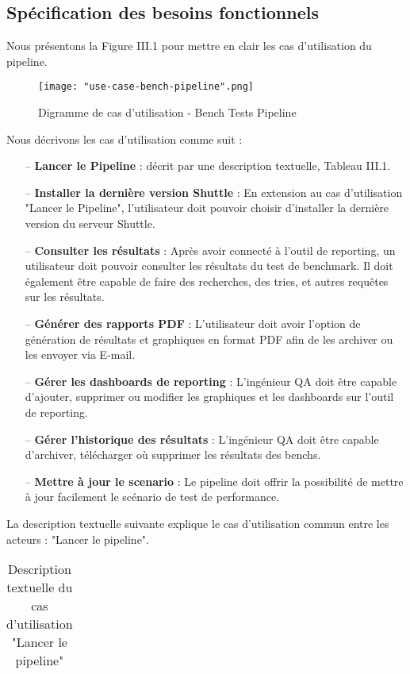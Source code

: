 \begin{spacing}{1.2}
\subsection{Spécification des besoins fonctionnels}
Nous présentons la Figure III.1 pour mettre en clair les cas d'utilisation du pipeline. 
\begin{figure}[!ht]\centering
\texttt{[image: "use-case-bench-pipeline".png]}
\caption{Digramme de cas d'utilisation - Bench Tests Pipeline}
\label{fig:fig1}
\end{figure}
\FloatBarrier
Nous décrivons les cas d'utilisation comme suit : 
\begin{itemize}
    \setlength\itemsep{0em}
    \item[--] \textbf{Lancer le Pipeline} : décrit par une description textuelle, Tableau III.1. 
    \item[--] \textbf{Installer la dernière version Shuttle} : En extension au cas d'utilisation "Lancer le Pipeline", l'utilisateur doit pouvoir choisir d'installer la dernière version du serveur Shuttle. 
    \item[--] \textbf{Consulter les résultats} : Après avoir connecté à l'outil de reporting, un utilisateur doit pouvoir consulter les résultats du test de benchmark. Il doit également être capable de faire des recherches, des tries, et autres requêtes sur les résultats.
    \item[--] \textbf{Générer des rapports PDF} : L'utilisateur doit avoir l'option de génération de résultats et graphiques en format PDF afin de les archiver ou les envoyer via E-mail.
    \item[--] \textbf{Gérer les dashboards de reporting} : L'ingénieur QA doit être capable d'ajouter, supprimer ou modifier les graphiques et les dashboards sur l'outil de reporting.
    \item[--] \textbf{Gérer l'historique des résultats} : L'ingénieur QA doit être capable d'archiver, télécharger où supprimer les résultats des benchs.
    \item[--] \textbf{Mettre à jour le scenario} : Le pipeline doit offrir la possibilité de mettre à jour facilement le scénario de test de performance.
\end{itemize}
La description textuelle suivante explique le cas d'utilisation commun entre les acteurs : "Lancer le pipeline".
\begin{table}[ht]
	\centering
	\caption{Description textuelle du cas d’utilisation "Lancer le pipeline"}
	\footnotesize
	\begin{tabularx}{\textwidth}{|p{3.3cm}|X|}

\end{tabularx}
\end{table}
\end{spacing}
